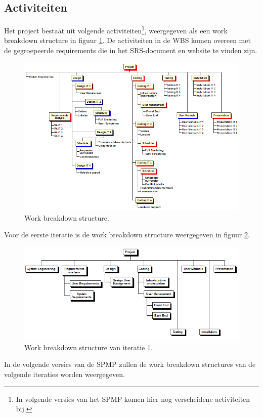 \subsection{Activiteiten}
Het project bestaat uit volgende activiteiten\footnote{In volgende versies van het SPMP komen hier nog verscheidene activiteiten bij.}, weergegeven als een work breakdown structure in figuur \ref{fig:workbreakdownstructure}. De activiteiten in de WBS komen overeen met de gegroepeerde requirements die in het SRS-document en website te vinden zijn.
\begin{figure} [H]
    \centering
    \includegraphics[width = \textwidth]{ManagerialProcess/WBSChart.png}
    \caption{Work breakdown structure.}
	\label{fig:workbreakdownstructure}
\end{figure}
Voor de eerste iteratie is de work breakdown structure weergegeven in figuur \ref{fig:wbsIteratie1}.
\begin{figure} [H]
	\centering
	\includegraphics[width = \textwidth]{ManagerialProcess/WBSChartIteratie1.png}
	\caption{Work breakdown structure van iteratie 1.}
	\label{fig:wbsIteratie1}
\end{figure}
In de volgende versies van de SPMP zullen de work breakdown structures van de volgende iteraties worden weergegeven.
